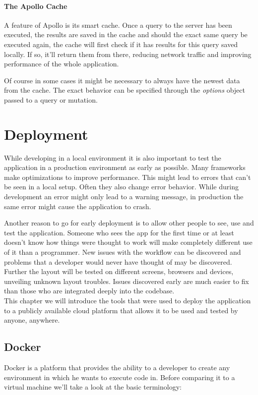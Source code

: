\subsubsection{The Apollo Cache}
A feature of Apollo is its smart cache. Once a query to the server has been executed, the results are saved in the cache and should the exact same query be executed again, the cache will first check if it has results for this query saved locally. If so, it'll return them from there, reducing network traffic and improving performance of the whole application. 

Of course in some cases it might be necessary to always have the newest data from the cache. The exact behavior can be specified through the \emph{options} object passed to a query or mutation.

\chapter{Deployment}

While developing in a local environment it is also important to test the application in a production environment as early as possible. Many frameworks make optimizations to improve performance. This might lead to errors that can't be seen in a local setup. Often they also change error behavior. While during development an error might only lead to a warning message, in production the same error might cause the application to crash.

Another reason to go for early deployment is to allow other people to see, use and test the application. Someone who sees the app for the first time or at least doesn't know how things were thought to work will make completely different use of it than a programmer. New issues with the workflow can be discovered and problems that a developer would never have thought of may be discovered. Further the layout will be tested on different screens, browsers and devices, unveiling unknown layout troubles. Issues discovered early are much easier to fix than those who are integrated deeply into the codebase. \\

This chapter we will introduce the tools that were used to deploy the application to a publicly available cloud platform that allows it to be used and tested by anyone, anywhere.

\section{Docker}
Docker is a platform that provides the ability to a developer to create any environment in which he wants to execute code in.
Before comparing it to a virtual machine we'll take a look at the basic terminology:

